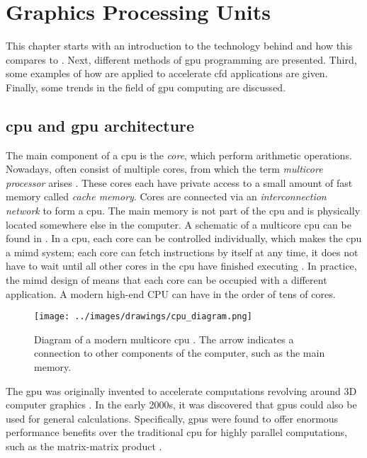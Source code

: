 \chapter{Graphics Processing Units} \label{chap:gpgpu}
This chapter starts with an introduction to the technology behind  and how this compares to . Next, different methods of \acrshort{gpu} programming are presented. Third, some examples of how  are applied to accelerate \acrshort{cfd} applications are given. Finally, some trends in the field of \acrshort{gpu} computing are discussed. 

\section{\acrshort{cpu} and \acrshort{gpu} architecture}
The main component of a \acrshort{cpu} is the \emph{core}, which perform arithmetic operations. Nowadays,  often consist of multiple cores, from which the term \emph{multicore processor} arises \citep{rauberParallelProgrammingMulticore2023}. These cores each have private access to a small amount of fast memory called \emph{cache memory}. Cores are connected via an \emph{interconnection network} to form a \acrshort{cpu}. The main memory is not part of the \acrshort{cpu} and is physically located somewhere else in the computer. A schematic of a multicore \acrshort{cpu} can be found in . In a \acrshort{cpu}, each core can be controlled individually, which makes the \acrshort{cpu} a \acrfull{mimd} system; each core can fetch instructions by itself at any time, it does not have to wait until all other cores in the \acrshort{cpu} have finished executing \citep{flynnVeryHighspeedComputing1966}. In practice, the \acrshort{mimd} design of  means that each core can be occupied with a different application. A modern high-end CPU can have in the order of tens of cores.

\begin{figure}
    \centering
    \texttt{[image: ../images/drawings/cpu\_diagram.png]}
    \caption{Diagram of a modern multicore \acrshort{cpu} \citep{rauberParallelProgrammingMulticore2023}. The arrow indicates a connection to other components of the computer, such as the main memory.}
    \label{fig:cpu_diagram}
\end{figure}

The \acrshort{gpu} was originally invented to accelerate computations revolving around 3D computer graphics \citep{aamondtGeneralPurposeGraphicsProcessing2018}. In the early 2000s, it was discovered that \acrshort{gpu}s could also be used for general calculations. Specifically, \acrshort{gpu}s were found to offer enormous performance benefits over the traditional \acrfull{cpu} for highly parallel computations, such as the matrix-matrix product \citep{larsenFastMatrixMultiplies2001}. 

